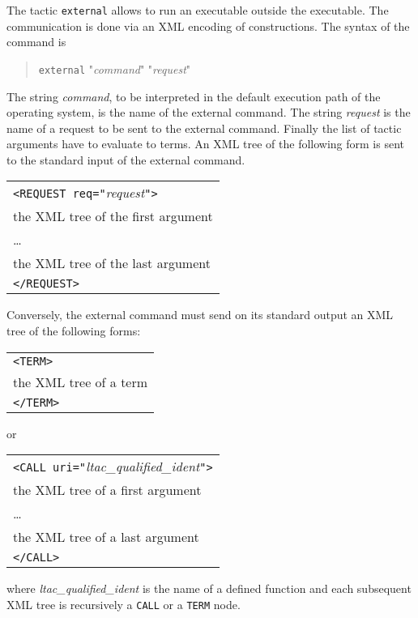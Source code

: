 The tactic {\tt external} allows to run an executable outside the
{\Coq} executable. The communication is done via an XML encoding of
constructions. The syntax of the command is

\begin{quote}
{\tt external} "\textsl{command}" "\textsl{request}" \nelist{\tacarg}{}
\end{quote}

The string \textsl{command}, to be interpreted in the default
execution path of the operating system, is the name of the external
command. The string \textsl{request} is the name of a request to be
sent to the external command. Finally the list of tactic arguments
have to evaluate to terms. An XML tree of the following form is sent
to the standard input of the external command.
\medskip

\begin{tabular}{l}
\texttt{<REQUEST req="}\textsl{request}\texttt{">}\\
the XML tree of the first argument\\
{\ldots}\\
the XML tree of the last argument\\
\texttt{</REQUEST>}\\
\end{tabular}
\medskip

Conversely, the external command must send on its standard output an
XML tree of the following forms:

\medskip
\begin{tabular}{l}
\texttt{<TERM>}\\
the XML tree of a term\\
\texttt{</TERM>}\\
\end{tabular}
\medskip

\noindent or 

\medskip
\begin{tabular}{l}
\texttt{<CALL uri="}\textsl{ltac\_qualified\_ident}\texttt{">}\\
the XML tree of a first argument\\
{\ldots}\\
the XML tree of a last argument\\
\texttt{</CALL>}\\
\end{tabular}

\medskip
\noindent where \textsl{ltac\_qualified\_ident} is the name of a
defined {\ltac} function and each subsequent XML tree is recursively a
\texttt{CALL} or a \texttt{TERM} node.

